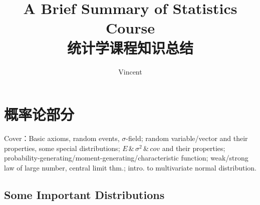 \documentclass[11pt,a4paper]{ctexart}
\title{\textbf{A Brief Summary of Statistics Course}\\统计学课程知识总结}
\author{Vincent}
\numberwithin{equation}{section}%
\begin{document}
\maketitle

\tableofcontents
\newpage









\section{概率论部分}\label{Section1Probability}
    Cover：Basic axioms, random events, $\sigma$-field; random variable/vector and their properties, some special distributions; $E$\,\&\,$\sigma^2$\,\&\,$cov$ and their properties; probability-generating/moment-generating/characteristic function; weak/strong law of large number, central limit thm.; intro. to multivariate normal distribution.



\subsection{Some Important Distributions}\label{SectionImportantDistributions}
\end{document}
